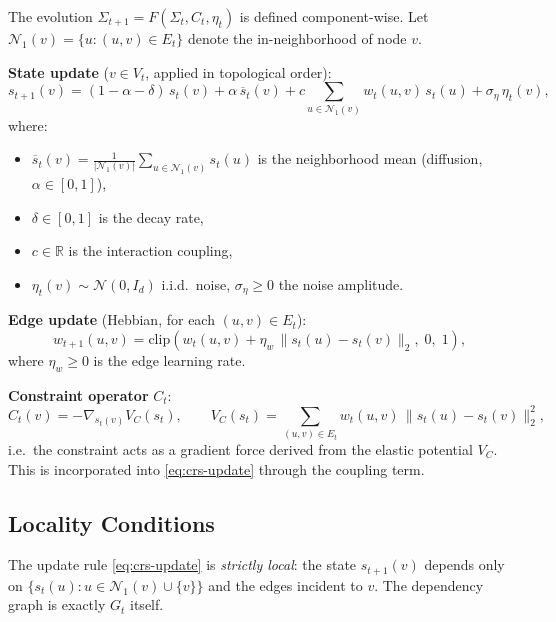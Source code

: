 \begin{definition}\label{def:12.10-update}
The evolution $\Sigma_{t+1} = F(\Sigma_t, C_t, \eta_t)$ is defined
component-wise.  Let $\mathcal{N}_1(v) = \{u : (u,v) \in E_t\}$
denote the in-neighborhood of node $v$.

\textbf{State update} ($v \in V_t$, applied in topological order):
\begin{equation}\label{eq:crs-update}
  s_{t+1}(v) = (1 - \alpha - \delta)\,s_t(v)
  + \alpha\,\overline{s}_t(v) + c\!\sum_{u \in \mathcal{N}_1(v)} w_t(u,v)\,s_t(u)
  + \sigma_\eta\,\eta_t(v),
\end{equation}
where:
\begin{itemize}
  \item $\overline{s}_t(v) = \frac{1}{|\mathcal{N}_1(v)|}\sum_{u \in \mathcal{N}_1(v)} s_t(u)$
    is the neighborhood mean (diffusion, $\alpha \in [0,1]$),
  \item $\delta \in [0,1]$ is the decay rate,
  \item $c \in \mathbb{R}$ is the interaction coupling,
  \item $\eta_t(v) \sim \mathcal{N}(0, I_d)$ i.i.d.\ noise,
    $\sigma_\eta \geq 0$ the noise amplitude.
\end{itemize}

\textbf{Edge update} (Hebbian, for each $(u,v) \in E_t$):
\begin{equation}\label{eq:edge-update}
  w_{t+1}(u,v) = \mathrm{clip}\!\left(
    w_t(u,v) + \eta_w\,\|s_t(u) - s_t(v)\|_2,\; 0,\; 1
  \right),
\end{equation}
where $\eta_w \geq 0$ is the edge learning rate.

\textbf{Constraint operator} $C_t$:
\begin{equation}\label{eq:constraint-op}
  C_t(v) = -\nabla_{s_t(v)} V_C(s_t),
  \qquad
  V_C(s_t) = \sum_{(u,v) \in E_t} w_t(u,v)\,\|s_t(u) - s_t(v)\|_2^2,
\end{equation}
i.e.\ the constraint acts as a gradient force derived from the elastic
potential $V_C$.  This is incorporated into \eqref{eq:crs-update}
through the coupling term.
\end{definition}

\subsection{Locality Conditions}

\begin{lemma}\label{lem:12.2}
The update rule \eqref{eq:crs-update} is \emph{strictly local}: the
state $s_{t+1}(v)$ depends only on
$\{s_t(u) : u \in \mathcal{N}_1(v) \cup \{v\}\}$ and the edges
incident to $v$.  The dependency graph is exactly $G_t$ itself.
\end{lemma}

